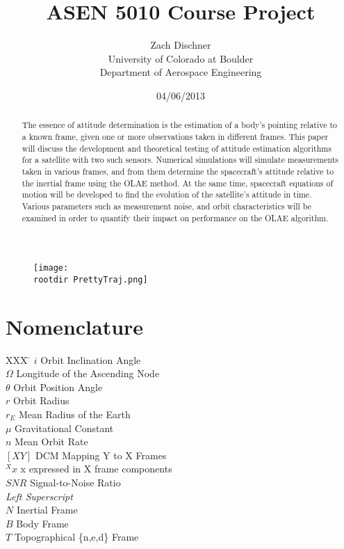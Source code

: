 \documentclass[11pt]{aiaa-tc}%
\title{ASEN 5010 Course Project}
\author{Zach Dischner \\ University of Colorado at Boulder \\ Department of Aerospace Engineering}
\date{04/06/2013}
\newcommand{\rootdir}{./Figures/}
\begin{document}
\maketitle

\begin{abstract}
The essence of attitude determination is the estimation of a body's pointing relative to a known frame, given one or more observations taken in different frames. This paper will discuss the development and theoretical testing of attitude estimation algorithms for a satellite with two such sensors. Numerical simulations will simulate measurements taken in various frames, and from them determine the spacecraft's attitude relative to the inertial frame using the OLAE method. At the same time, spacecraft equations of motion will be developed to find the evolution of the satellite's attitude in time. Various parameters such as measurement noise, and orbit characteristics will be examined in order to quantify their impact on performance on the OLAE algorithm. 

\end{abstract}

\begin{centering}
	\begin{figure}[Hh]
	\hspace{2.5cm}
		\texttt{[image: \\rootdir PrettyTraj.png]} 
	\end{figure}
\end{centering}

\vspace{2cm}

\section*{Nomenclature}

\begin{tabbing}
  XXX \= \kill%
  $i$ \> 		Orbit Inclination Angle 			\\
  $\Omega$ \> 	Longitude of the Ascending Node 	\\
  $\theta$ \> 	Orbit Position Angle 				\\
  $r$ \> 		Orbit Radius 					\\
  $r_E$ \> 		Mean Radius of the Earth			\\
  $\mu$ \> 	Gravitational Constant 			\\
  $n$ \> 		Mean Orbit Rate				\\
  $[XY]$ \> 	DCM Mapping Y to X Frames 		\\
  $^Xx$ \>  	x expressed in X frame components \\
  $SNR$ \> 	Signal-to-Noise Ratio			\\

\textit{Left Superscript}\\
  $N$ \> 		Inertial Frame 					\\
  $B$ \> 		Body Frame 					\\
  $T$ \> 		Topographical \{n,e,d\} Frame 		\\
 \end{tabbing}
\end{document}
